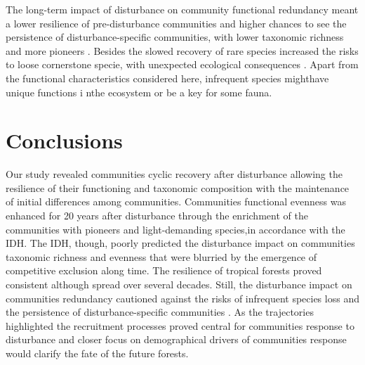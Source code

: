 \documentclass[fleqn,10pt]{ArtEcoFoG} %
\begin{document}
The long-term impact of disturbance on community functional redundancy
meant a lower resilience of pre-disturbance communities and higher
chances to see the persistence of disturbance-specific communities, with
lower taxonomic richness and more pioneers
\citep{Haddad2008, Burslem2000, Martin2013}. Besides the slowed recovery
of rare species increased the risks to loose cornerstone specie, with
unexpected ecological consequences
\citep{Jones1994, Chazdon2003a, Diaz2005, Gardner2007}. Apart from the
functional characteristics considered here, infrequent species mighthave
unique functions i nthe ecosystem or be a key for some fauna.

\section{Conclusions}\label{conclusions}

Our study revealed communities cyclic recovery after disturbance
allowing the resilience of their functioning and taxonomic composition
with the maintenance of initial differences among communities.
Communities functional evenness was enhanced for 20 years after
disturbance through the enrichment of the communities with pioneers and
light-demanding species,in accordance with the IDH. The IDH, though,
poorly predicted the disturbance impact on communities taxonomic
richness and evenness that were blurried by the emergence of competitive
exclusion along time. The resilience of tropical forests proved
consistent although spread over several decades. Still, the disturbance
impact on communities redundancy cautioned against the risks of
infrequent species loss and the persistence of disturbance-specific
communities \citep{Gourlet-Fleury2005}. As the trajectories highlighted
the recruitment processes proved central for communities response to
disturbance and closer focus on demographical drivers of communities
response would clarify the fate of the future forests.



\makeatletter

\makeatother


\end{document}
